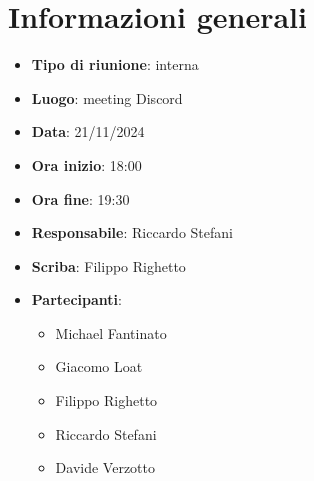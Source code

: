 


\section{Informazioni generali}

\begin{itemize}
    \item \textbf{Tipo di riunione}: interna
    \item \textbf{Luogo}: meeting Discord
    \item \textbf{Data}: 21/11/2024
    \item \textbf{Ora inizio}: 18:00
    \item \textbf{Ora fine}: 19:30
    \item \textbf{Responsabile}: Riccardo Stefani
    \item \textbf{Scriba}: Filippo Righetto
    \item \textbf{Partecipanti}:
    \begin{itemize}
        \item Michael Fantinato
        \item Giacomo Loat
        \item Filippo Righetto
        \item Riccardo Stefani
        \item Davide Verzotto
    \end{itemize}
\end{itemize}
